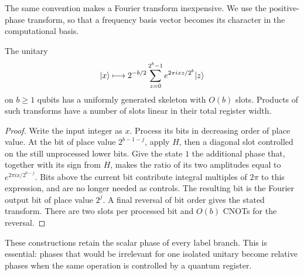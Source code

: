 The same convention makes a Fourier transform inexpensive. We use the
positive-phase transform, so that a frequency basis vector becomes its
character in the computational basis.

\begin{lemma}\label{slot:fourier}
The unitary
\[
 \lvert x\rangle\longmapsto 2^{-b/2}\sum_{z=0}^{2^b-1}
       e^{2\pi i xz/2^b}\lvert z\rangle
\]
on $b\ge1$ qubits has a uniformly generated skeleton with $O(b)$ slots.
Products of such transforms have a number of slots linear in their total
register width.
\end{lemma}

\begin{proof}
Write the input integer as $x$. Process its bits in decreasing order of
place value. At the bit of place value $2^{b-1-j}$, apply $H$, then a
diagonal slot controlled on the still unprocessed lower bits. Give the
state $1$ the additional phase that, together with its sign from $H$,
makes the ratio of its two amplitudes equal to
$e^{2\pi i x/2^{b-j}}$. Bits above the current bit contribute integral
multiples of $2\pi$ to this expression, and are no longer needed as
controls. The resulting bit is the Fourier output bit of place value
$2^j$. A final reversal of bit order gives the stated transform. There are
two slots per processed bit and $O(b)$ CNOTs for the reversal.
\end{proof}

These constructions retain the scalar phase of every label branch. This is
essential: phases that would be irrelevant for one isolated unitary become
relative phases when the same operation is controlled by a quantum register.
